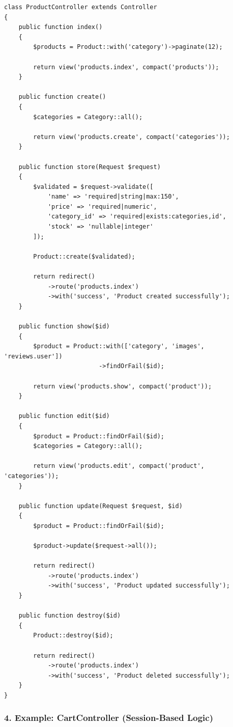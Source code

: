 \documentclass[12pt,a4paper]{article}
\begin{document}
\begin{verbatim}
class ProductController extends Controller
{
    public function index()
    {
        $products = Product::with('category')->paginate(12);

        return view('products.index', compact('products'));
    }

    public function create()
    {
        $categories = Category::all();

        return view('products.create', compact('categories'));
    }

    public function store(Request $request)
    {
        $validated = $request->validate([
            'name' => 'required|string|max:150',
            'price' => 'required|numeric',
            'category_id' => 'required|exists:categories,id',
            'stock' => 'nullable|integer'
        ]);

        Product::create($validated);

        return redirect()
            ->route('products.index')
            ->with('success', 'Product created successfully');
    }

    public function show($id)
    {
        $product = Product::with(['category', 'images', 'reviews.user'])
                          ->findOrFail($id);

        return view('products.show', compact('product'));
    }

    public function edit($id)
    {
        $product = Product::findOrFail($id);
        $categories = Category::all();

        return view('products.edit', compact('product', 'categories'));
    }

    public function update(Request $request, $id)
    {
        $product = Product::findOrFail($id);

        $product->update($request->all());

        return redirect()
            ->route('products.index')
            ->with('success', 'Product updated successfully');
    }

    public function destroy($id)
    {
        Product::destroy($id);

        return redirect()
            ->route('products.index')
            ->with('success', 'Product deleted successfully');
    }
}
\end{verbatim}

\subsubsection{4. Example: CartController (Session-Based Logic)}
\end{document}
